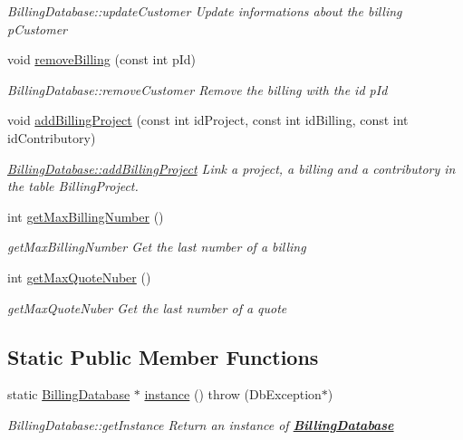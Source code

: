 \begin{DoxyCompactItemize}
\begin{DoxyCompactList}\small\item\em Billing\+Database\+::update\+Customer Update informations about the billing {\itshape p\+Customer} \end{DoxyCompactList}\item 
void \hyperlink{classDatabase_1_1BillingDatabase_af419d6b120523e9c67d5c89bcfcd44dd}{remove\+Billing} (const int p\+Id)
\begin{DoxyCompactList}\small\item\em Billing\+Database\+::remove\+Customer Remove the billing with the id {\itshape p\+Id} \end{DoxyCompactList}\item 
void \hyperlink{classDatabase_1_1BillingDatabase_a38514a0874d27551c67d56b9a7ec340e}{add\+Billing\+Project} (const int id\+Project, const int id\+Billing, const int id\+Contributory)
\begin{DoxyCompactList}\small\item\em \hyperlink{classDatabase_1_1BillingDatabase_a38514a0874d27551c67d56b9a7ec340e}{Billing\+Database\+::add\+Billing\+Project} Link a project, a billing and a contributory in the table Billing\+Project. \end{DoxyCompactList}\item 
int \hyperlink{classDatabase_1_1BillingDatabase_ac00c08641d0f4cc0596430f8e888ee38}{get\+Max\+Billing\+Number} ()
\begin{DoxyCompactList}\small\item\em get\+Max\+Billing\+Number Get the last number of a billing \end{DoxyCompactList}\item 
int \hyperlink{classDatabase_1_1BillingDatabase_ad9fe39d053a7f8686e1d94bc41eda03e}{get\+Max\+Quote\+Nuber} ()
\begin{DoxyCompactList}\small\item\em get\+Max\+Quote\+Nuber Get the last number of a quote \end{DoxyCompactList}\end{DoxyCompactItemize}
\subsection*{Static Public Member Functions}
\begin{DoxyCompactItemize}
\item 
static \hyperlink{classDatabase_1_1BillingDatabase}{Billing\+Database} $\ast$ \hyperlink{classDatabase_1_1BillingDatabase_a3ab4bd6cc25a186856aac757d6213aa0}{instance} ()  throw (\+Db\+Exception$\ast$)
\begin{DoxyCompactList}\small\item\em Billing\+Database\+::get\+Instance Return an instance of {\bfseries \hyperlink{classDatabase_1_1BillingDatabase}{Billing\+Database}} \end{DoxyCompactList}\end{DoxyCompactItemize}
